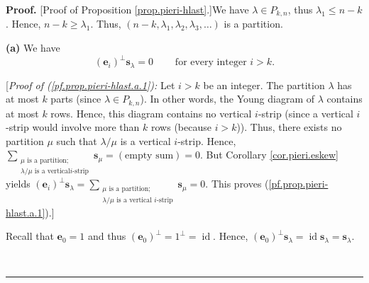 \documentclass[numbers=enddot,12pt,final,onecolumn,notitlepage]{scrartcl}%
\theoremstyle{definition}
\newenvironment{proof}[1][Proof]{\noindent\textbf{#1.} }{\ \rule{0.5em}{0.5em}}
\let\sumnonlimits\sum
\renewcommand{\sum}{\sumnonlimits\limits}
\begin{document}
\begin{proof}
[Proof of Proposition \ref{prop.pieri-hlast}.]We have $\lambda\in P_{k,n}$,
thus $\lambda_{1}\leq n-k$. Hence, $n-k\geq\lambda_{1}$. Thus, $\left(
n-k,\lambda_{1},\lambda_{2},\lambda_{3},\ldots\right)  $ is a partition.

\textbf{(a)} We have
\begin{equation}
\left(  \mathbf{e}_{i}\right)  ^{\perp}\mathbf{s}_{\lambda}%
=0\ \ \ \ \ \ \ \ \ \ \text{for every integer }i>k.
\label{pf.prop.pieri-hlast.a.1}%
\end{equation}


[\textit{Proof of (\ref{pf.prop.pieri-hlast.a.1}):} Let $i>k$ be an integer.
The partition $\lambda$ has at most $k$ parts (since $\lambda\in P_{k,n}$). In
other words, the Young diagram of $\lambda$ contains at most $k$ rows. Hence,
this diagram contains no vertical $i$-strip (since a vertical $i$-strip would
involve more than $k$ rows (because $i>k$)). Thus, there exists no partition
$\mu$ such that $\lambda/\mu$ is a vertical $i$-strip. Hence, $\sum
_{\substack{\mu\text{ is a partition;}\\\lambda/\mu\text{ is a vertical
}i\text{-strip}}}\mathbf{s}_{\mu}=\left(  \text{empty sum}\right)  =0$. But
Corollary \ref{cor.pieri.eskew} yields $\left(  \mathbf{e}_{i}\right)
^{\perp}\mathbf{s}_{\lambda}=\sum_{\substack{\mu\text{ is a partition;}%
\\\lambda/\mu\text{ is a vertical }i\text{-strip}}}\mathbf{s}_{\mu}=0$. This
proves (\ref{pf.prop.pieri-hlast.a.1}).]

Recall that $\mathbf{e}_{0}=1$ and thus $\left(  \mathbf{e}_{0}\right)
^{\perp}=1^{\perp}=\operatorname*{id}$. Hence, $\left(  \mathbf{e}_{0}\right)
^{\perp}\mathbf{s}_{\lambda}=\operatorname*{id}\mathbf{s}_{\lambda}%
=\mathbf{s}_{\lambda}$.


\end{proof}
\end{document}
